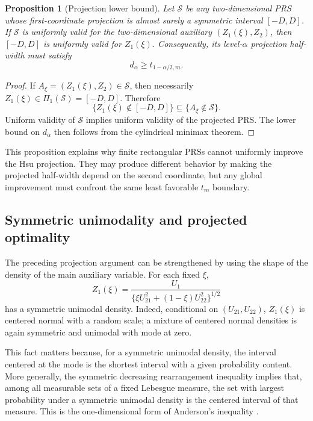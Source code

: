 \documentclass[12pt]{article}
\newtheorem{proposition}{Proposition}
\begin{document}
\begin{proposition}[Projection lower bound]
Let \(\mathcal S\) be any two-dimensional PRS whose first-coordinate
projection is almost surely a symmetric interval \([-D,D]\).  If
\(\mathcal S\) is uniformly valid for the two-dimensional auxiliary
\((Z_1(\xi),Z_2)\), then \([-D,D]\) is uniformly valid for \(Z_1(\xi)\).
Consequently, its level-\(\alpha\) projection half-width must satisfy
\[
d_\alpha\geq t_{1-\alpha/2,m}.
\]
\end{proposition}

\begin{proof}
If \(A_\xi=(Z_1(\xi),Z_2)\in\mathcal S\), then necessarily
\(Z_1(\xi)\in\Pi_1(\mathcal S)=[-D,D]\).  Therefore
\[
\{Z_1(\xi)\notin[-D,D]\}
\subseteq
\{A_\xi\notin\mathcal S\}.
\]
Uniform validity of \(\mathcal S\) implies uniform validity of the projected
PRS.  The lower bound on \(d_\alpha\) then follows from the cylindrical
minimax theorem.
\end{proof}

This proposition explains why finite rectangular PRSs cannot uniformly improve
the Hsu projection.  They may produce different behavior by making the
projected half-width depend on the second coordinate, but any global
improvement must confront the same least favorable \(t_m\) boundary.

\subsection{Symmetric unimodality and projected optimality}

The preceding projection argument can be strengthened by using the shape of
the density of the main auxiliary variable.  For each fixed \(\xi\),
\[
Z_1(\xi)
=
\frac{U_1}
{\{\xi U_{21}^2+(1-\xi)U_{22}^2\}^{1/2}}
\]
has a symmetric unimodal density.  Indeed, conditional on
\((U_{21},U_{22})\), \(Z_1(\xi)\) is centered normal with a random scale; a
mixture of centered normal densities is again symmetric and unimodal with mode
at zero.

This fact matters because, for a symmetric unimodal density, the interval
centered at the mode is the shortest interval with a given probability
content.  More generally, the symmetric decreasing rearrangement inequality
implies that, among all measurable sets of a fixed Lebesgue measure, the set
with largest probability under a symmetric unimodal density is the centered
interval of that measure.  This is the one-dimensional form of Anderson's
inequality \citep{Anderson1955}.
\end{document}
